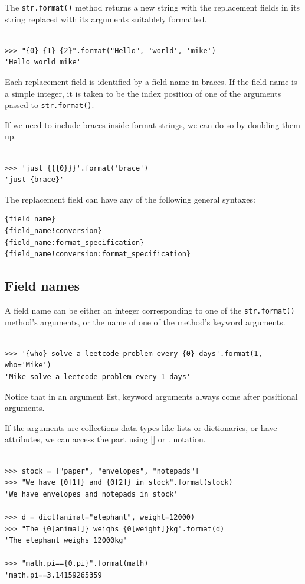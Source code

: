 The \verb|str.format()| method returns a new string with the replacement fields in its string replaced with its arguments suitablely formatted.


\begin{lstlisting}

>>> "{0} {1} {2}".format("Hello", 'world', 'mike')
'Hello world mike'
\end{lstlisting}


Each replacement field is identified by a field name in braces.
If the field name is a simple integer, it is taken to be the index position of one of the arguments passed to \verb|str.format()|.


If we need to include braces inside format strings, we can do so by doubling them up.
\begin{lstlisting}

>>> 'just {{{0}}}'.format('brace')
'just {brace}'
\end{lstlisting}



The replacement field can have any of the following general syntaxes:
\begin{verbatim}
{field_name}
{field_name!conversion}
{field_name:format_specification}
{field_name!conversion:format_specification}
\end{verbatim}


\subsection{Field names}

A field name can be either an integer corresponding to one of the \verb|str.format()| method’s arguments, or the name of one of the method’s keyword arguments.

\begin{lstlisting}

>>> '{who} solve a leetcode problem every {0} days'.format(1, who='Mike')
'Mike solve a leetcode problem every 1 days'
\end{lstlisting}


Notice that in an argument list, keyword arguments always come after positional arguments.



If the arguments are collections data types like lists or dictionaries, or have attributes, we can access the part using [] or . notation.


\begin{lstlisting}

>>> stock = ["paper", "envelopes", "notepads"] 
>>> "We have {0[1]} and {0[2]} in stock".format(stock)
'We have envelopes and notepads in stock'

>>> d = dict(animal="elephant", weight=12000)
>>> "The {0[animal]} weighs {0[weight]}kg".format(d) 
'The elephant weighs 12000kg'

>>> "math.pi=={0.pi}".format(math) 
'math.pi==3.14159265359
\end{lstlisting}




